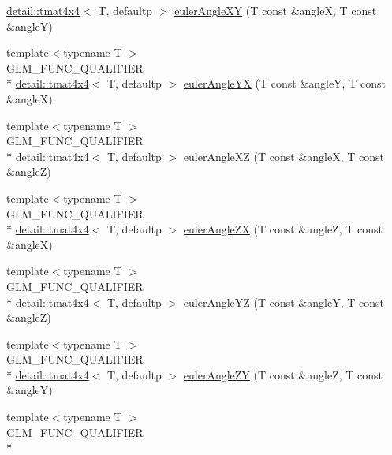 \begin{DoxyCompactItemize}
\hyperlink{structglm_1_1detail_1_1tmat4x4}{detail\-::tmat4x4}$<$ T, defaultp $>$ \hyperlink{group__gtx__euler__angles_ga83a52d36fd752c92ce189197b51ea785}{euler\-Angle\-X\-Y} (T const \&angle\-X, T const \&angle\-Y)
\item 
{\footnotesize template$<$typename T $>$ }\\G\-L\-M\-\_\-\-F\-U\-N\-C\-\_\-\-Q\-U\-A\-L\-I\-F\-I\-E\-R \\*
\hyperlink{structglm_1_1detail_1_1tmat4x4}{detail\-::tmat4x4}$<$ T, defaultp $>$ \hyperlink{group__gtx__euler__angles_ga7599a8aaf3bf33b15517dd522a6d8020}{euler\-Angle\-Y\-X} (T const \&angle\-Y, T const \&angle\-X)
\item 
{\footnotesize template$<$typename T $>$ }\\G\-L\-M\-\_\-\-F\-U\-N\-C\-\_\-\-Q\-U\-A\-L\-I\-F\-I\-E\-R \\*
\hyperlink{structglm_1_1detail_1_1tmat4x4}{detail\-::tmat4x4}$<$ T, defaultp $>$ \hyperlink{group__gtx__euler__angles_ga61110cb520fbf21dd541cf4e25d81a65}{euler\-Angle\-X\-Z} (T const \&angle\-X, T const \&angle\-Z)
\item 
{\footnotesize template$<$typename T $>$ }\\G\-L\-M\-\_\-\-F\-U\-N\-C\-\_\-\-Q\-U\-A\-L\-I\-F\-I\-E\-R \\*
\hyperlink{structglm_1_1detail_1_1tmat4x4}{detail\-::tmat4x4}$<$ T, defaultp $>$ \hyperlink{group__gtx__euler__angles_ga5766bbe3f5b17b5c33ed21b2933ff278}{euler\-Angle\-Z\-X} (T const \&angle\-Z, T const \&angle\-X)
\item 
{\footnotesize template$<$typename T $>$ }\\G\-L\-M\-\_\-\-F\-U\-N\-C\-\_\-\-Q\-U\-A\-L\-I\-F\-I\-E\-R \\*
\hyperlink{structglm_1_1detail_1_1tmat4x4}{detail\-::tmat4x4}$<$ T, defaultp $>$ \hyperlink{group__gtx__euler__angles_ga4bff0f8324770261d3a6ddadd790ec22}{euler\-Angle\-Y\-Z} (T const \&angle\-Y, T const \&angle\-Z)
\item 
{\footnotesize template$<$typename T $>$ }\\G\-L\-M\-\_\-\-F\-U\-N\-C\-\_\-\-Q\-U\-A\-L\-I\-F\-I\-E\-R \\*
\hyperlink{structglm_1_1detail_1_1tmat4x4}{detail\-::tmat4x4}$<$ T, defaultp $>$ \hyperlink{group__gtx__euler__angles_gaeabd76319f5a19188a0423769950df76}{euler\-Angle\-Z\-Y} (T const \&angle\-Z, T const \&angle\-Y)
\item 
{\footnotesize template$<$typename T $>$ }\\G\-L\-M\-\_\-\-F\-U\-N\-C\-\_\-\-Q\-U\-A\-L\-I\-F\-I\-E\-R \\*

\end{DoxyCompactItemize}
